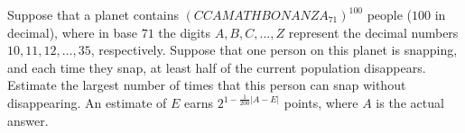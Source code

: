 Suppose that a planet contains $\left(CCAMATHBONANZA_{71}\right)^{100}$ people ($100$ in decimal), where in base $71$ the digits $A,B,C,\ldots,Z$ represent the decimal numbers $10,11,12,\ldots,35$, respectively. Suppose that one person on this planet is snapping, and each time they snap, at least half of the current population disappears. Estimate the largest number of times that this person can snap without disappearing. An estimate of $E$ earns $2^{1-\frac{1}{200}\left|A-E\right|}$ points, where $A$ is the actual answer.